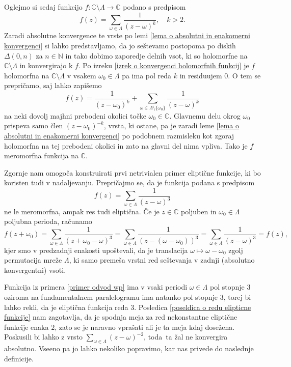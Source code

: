 \documentclass[mat1]{fmfdelo}
\newcommand{\N}{\mathbb N}
\newcommand{\C}{\mathbb C}
\newcommand{\om}{\omega}
\newcommand{\disk}[2]{\Delta(#1, #2)}
\theoremstyle{definition}
\begin{document}
\begin{dokaz}
    \cite[\S 5, Theorem 1]{Ahlfors}
\end{dokaz}
    
Oglejmo si sedaj funkcijo $f:\C\setminus\Lambda \to \C$ podano s predpisom
\[
    f(z) = \sum_{\om \in \Lambda} \frac{1}{(z - \om)^k}, \quad k > 2.
\]
Zaradi absolutne konvergence te vrste po lemi \ref{lema o absolutni in enakomerni konvergenci} si lahko predstavljamo, da jo seštevamo postopoma po diskih $\disk{0}{n}$ za $n\in\N$ in tako dobimo zaporedje delnih vsot, ki so holomorfne na $\C\setminus\Lambda$ in konvergirajo k $f$. Po izreku \ref{izrek o konvergenci holomorfnih funkcij} je $f$ holomorfna na $\C \setminus \Lambda$ v vsakem $\om_0 \in \Lambda$ pa ima pol reda $k$ in residuujem $0$. O tem se prepričamo, saj lahko zapišemo
\[
    f(z) = \frac{1}{(z-\om_0)^k} + \sum_{\om \in \Lambda \setminus \{\om_0\}} \frac{1}{(z - \om)^k}
\]
na neki dovolj majhni prebodeni okolici točke $\om_0\in \C$. Glavnemu delu okrog $\om_0$ prispeva samo člen $(z - \om_0)^{-k}$, vrsta, ki ostane, pa je zaradi leme \ref{lema o absolutni in enakomerni konvergenci} po podobnem razmisleku kot zgoraj holomorfna na tej prebodeni okolici in zato na glavni del nima vpliva. Tako je $f$ meromorfna funkcija na $\C$. 

\begin{primer*}
    \label{primer odvod wp}
    Zgornje nam omogoča konstruirati prvi netrivialen primer eliptične funkcije, ki bo koristen tudi v nadaljevanju. Prepričajmo se, da je funkcija podana s predpisom
    \[
        f(z) = \sum_{\om \in \Lambda} \frac{1}{(z - \om)^3}
    \]
    ne le meromorfna, ampak res tudi eliptična. Če je $z \in \C$ poljuben in $\om_0 \in \Lambda$ poljubna perioda, računamo
    \[
        f(z + \om_0) = 
        \sum_{\om \in \Lambda} \frac{1}{(z + \om_0 - \om)^3} = 
        \sum_{\om \in \Lambda} \frac{1}{(z - (\om - \om_0))^3} = 
        \sum_{\om \in \Lambda} \frac{1}{(z - \om)^3} = 
        f(z),
    \]
    kjer smo v predzadnji enakosti upoštevali, da je translacija $\om \mapsto \om - \om_0$ zgolj permutacija mreže $\Lambda$, ki samo premeša vrstni red seštevanja v zadnji (absolutno konvergentni) vsoti. 
\end{primer*}

Funkcija iz primera \ref{primer odvod wp} ima v vsaki periodi $\om\in \Lambda$ pol stopnje $3$ oziroma na fundamentalnem paralelogramu ima natanko pol stopnje $3$, torej bi lahko rekli, da je eliptična funkcija reda $3$. Posledica \ref{poseldica o redu elipticne funkcije} nam zagotavlja, da je spodnja meja za red nekonstantne eliptične funkcije enaka $2$, zato se je naravno vprašati ali je ta meja kdaj dosežena. Poskusili bi lahko z vrsto $\sum_{\om\in\Lambda}(z - \om)^{-2}$, toda ta žal ne konvergira absolutno. Vseeno pa jo lahko nekoliko popravimo, kar nas privede do naslednje definicije. 
\end{document}
